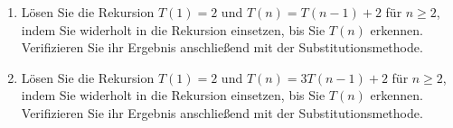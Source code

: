 \begin{exercise}
  \begin{enumerate}[label = \alph*]
  \item Lösen Sie die Rekursion $T(1) = 2$ und $T(n) = T(n-1) + 2$ für $n \geq 2$, indem Sie widerholt in die Rekursion einsetzen, bis Sie $T(n)$ erkennen. Verifizieren Sie ihr Ergebnis anschließend mit der Substitutionsmethode.

  \item Lösen Sie die Rekursion $T(1) = 2$ und $T(n) = 3T(n-1) + 2$ für $n \geq 2$, indem Sie widerholt in die Rekursion einsetzen, bis Sie $T(n)$ erkennen. Verifizieren Sie ihr Ergebnis anschließend mit der Substitutionsmethode.
  \end{enumerate}
\end{exercise}


